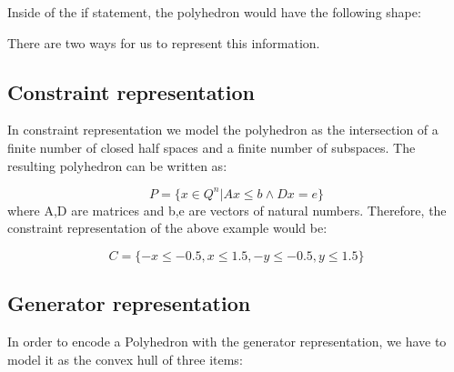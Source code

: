 Inside of the if statement, the polyhedron would have the following shape:


\begin{center}
\end{center}
There are two ways for us to represent this information.
\subsection{Constraint representation}
In constraint representation we model the polyhedron as the intersection of a finite number of closed half spaces and a finite number of subspaces. The resulting polyhedron can be written as:

\begin{equation}
	P=\{x\in Q^n |Ax\leq b \wedge Dx=e\}
\end{equation}
where A,D are matrices and b,e are vectors of natural numbers. Therefore, the constraint representation of the above example would be:

\begin{equation}
	C = \{-x \leq -0.5,x\leq 1.5 , -y \leq -0.5 ,y\leq 1.5\}
\end{equation}

\subsection{Generator representation}
In order to encode a Polyhedron with the generator representation, we have to model it as the convex hull of three items: 

